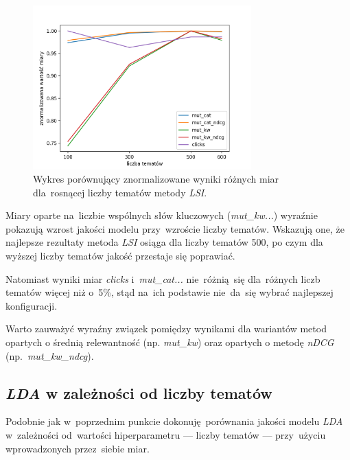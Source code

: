 \documentclass[pl]{minipw} %
\begin{document}
\begin{figure}[H]
	\centering
	\includegraphics[width=0.75\textwidth]{img/results/lsi_.png}
	\caption{Wykres porównujący znormalizowane wyniki różnych miar dla~rosnącej liczby tematów metody \textit{LSI}.}
\end{figure}

Miary oparte na~liczbie wspólnych słów kluczowych (\textit{mut\_kw...}) wyraźnie pokazują wzrost jakości modelu przy~wzroście liczby tematów. Wskazują one, że najlepsze rezultaty metoda \textit{LSI} osiąga dla liczby tematów 500, po czym dla wyższej liczby tematów jakość przestaje się poprawiać.

Natomiast wyniki miar \textit{clicks} i~\textit{mut\_cat...} nie~różnią~się dla~różnych liczb tematów więcej niż o~5\%, stąd na~ich podstawie nie~da~się wybrać najlepszej konfiguracji.

Warto zauważyć wyraźny związek pomiędzy wynikami dla wariantów metod opartych o średnią relewantność (np. \textit{mut\_kw}) oraz opartych o metodę \textit{nDCG} (np.~\textit{mut\_kw\_ndcg}).

\subsection{\textit{LDA} w zależności od liczby tematów}

Podobnie jak w~poprzednim punkcie dokonuję porównania jakości modelu \textit{LDA} w~zależności od~wartości hiperparametru --- liczby tematów --- przy~użyciu wprowadzonych przez~siebie miar.
\end{document}
